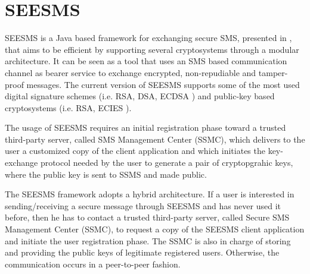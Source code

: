 \documentclass[authoryear]{elsarticle}
\begin{document}
%

\section{SEESMS}

SEESMS is a Java based framework for exchanging secure SMS, presented in \cite{DeSantis2010}, that aims to be efficient by supporting several cryptosystems through a modular architecture.  It can be seen as a tool that uses an SMS based communication channel as bearer service to exchange encrypted, non-repudiable and tamper-proof messages. The current version of SEESMS supports some of the most used digital signature schemes (i.e. RSA, DSA, ECDSA \citep{JohnsonMV01}) and public-key based cryptosystems (i.e. RSA, ECIES \citep{sec1}). 

The usage of SEESMS requires an initial registration phase toward a trusted third-party server, called SMS Management Center (SSMC), which delivers to the user a customized copy of the client application and which initiates the key-exchange protocol needed by the user to generate a pair of cryptopgrahic  keys, where the public key is sent to SSMS and made public.

The SEESMS framework adopts a hybrid architecture. If a user is interested in sending/receiving a secure message through SEESMS and has never used it before, then he has to contact a trusted third-party server, called Secure SMS Management Center (SSMC), to request a copy of the SEESMS client application and initiate the user registration phase. The SSMC is also in charge of storing and providing the public keys of legitimate registered users. Otherwise, the communication occurs in a peer-to-peer fashion. 
\end{document}
